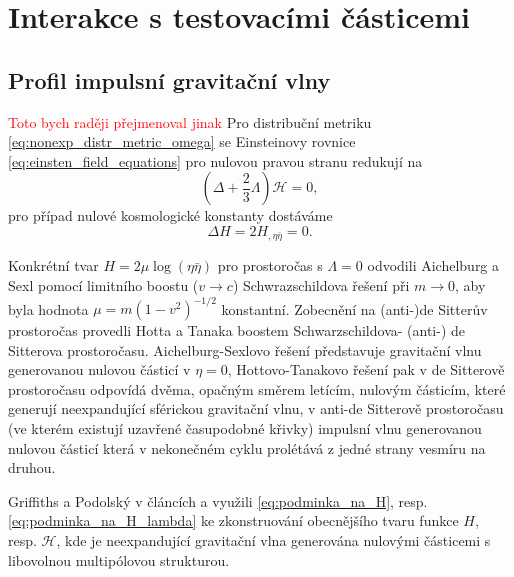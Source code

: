 \section{Interakce s testovacími částicemi}

\subsection{Profil impulsní gravitační vlny}
\textcolor{red}{Toto bych raději přejmenoval jinak}
Pro distribuční metriku \eqref{eq:nonexp_distr_metric_omega} se Einsteinovy rovnice \eqref{eq:einsten_field_equations} pro nulovou pravou stranu redukují na
\begin{equation}
    \label{eq:podminka_na_H_lambda}
    \left(\Delta + \frac{2}{3} \Lambda \right)\mathcal{H} = 0,
\end{equation}
pro případ nulové kosmologické konstanty dostáváme
\begin{equation}
    \label{eq:podminka_na_H}
    \Delta H = 2 H_{,\eta \bar{\eta}} = 0.
\end{equation}

Konkrétní tvar $H=2\mu \log(\eta \bar{\eta})$ pro prostoročas s $\Lambda=0$ odvodili Aichelburg a Sexl \cite{Aichelburg_1971} pomocí limitního boostu ($v \to c$)
Schwrazschildova řešení při $m \to 0$, aby byla hodnota $\mu = m(1-v^2)^{-1/2}$ konstantní.
Zobecnění na (anti-)de Sitterův prostoročas provedli Hotta a Tanaka \cite{Hotta_1993} 
boostem Schwarzschildova- (anti-) de Sitterova prostoročasu. Aichelburg-Sexlovo řešení představuje gravitační vlnu generovanou
nulovou částicí v $\eta = 0$, Hottovo-Tanakovo řešení pak v de Sitterově prostoročasu odpovídá dvěma, opačným směrem letícím, nulovým částicím,
které generují neexpandující sférickou gravitační vlnu, v anti-de Sitterově prostoročasu (ve kterém existují uzavřené časupodobné křivky) impulsní vlnu generovanou nulovou částicí
která v nekonečném cyklu prolétává z jedné strany vesmíru na druhou.

Griffiths a Podolský v článcích \cite{Griffiths_1997} a \cite{Podolsky1997} využili \eqref{eq:podminka_na_H}, resp. \eqref{eq:podminka_na_H_lambda}
ke zkonstruování obecnějšího tvaru funkce $H$, resp. $\mathcal{H}$, kde je neexpandující gravitační vlna generována
nulovými částicemi s libovolnou multipólovou strukturou.

